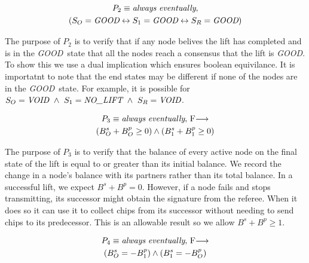 \documentclass[runningheads]{llncs}
\newcommand{\originatorstate}{S_O}
\newcommand{\relayastate}{S_1}
\newcommand{\refstate}{S_R}
\newcommand{\originatorsuccbal}{B^s_O}
\newcommand{\relayasuccbal}{B^s_1}
\newcommand{\originatorpredbal}{B^p_O}
\newcommand{\relayapredbal}{B^p_1}
\newcommand{\nolift}{\emph{NO\_LIFT}}
\newcommand{\void}{\emph{VOID}}
\newcommand{\good}{\emph{GOOD}}
\newcommand{\always}{\emph{always}}
\newcommand{\eventually}{\emph{eventually}}
\newcommand{\fair}{$F$}
\begin{document}
\begin{definition}[Property 2]
    
\begin{multline*}
P_2 \equiv \always\ \eventually, \\
    (\originatorstate = \good \leftrightarrow \relayastate = \good \leftrightarrow \refstate = \good) \\
\end{multline*}
\end{definition}
The purpose of $P_2$ is to verify that if any node belives the lift has completed and is in the \good\ state that all the nodes reach a consensus that the lift is \good. To show this we use a dual implication which ensures boolean equivilance. It is importatnt to note that the end states may be different if none of the nodes are in the \good\ state. For example, it is possible for $\originatorstate = \void\ \wedge\ \relayastate = \nolift\ \wedge\ \refstate = \void$.

\begin{definition}[Property 3]
\begin{multline*}
P_3 \equiv \always\ \eventually,\ \fair \longrightarrow \\
    (\originatorsuccbal + \originatorpredbal \ge 0) \wedge
    (\relayasuccbal + \relayapredbal \ge 0)\\
\end{multline*}
\end{definition}

The purpose of $P_3$ is to verify that the balance of every active node on the final state of the lift is equal to or greater than its initial balance. We record the change in a node's balance with its partners rather than its total balance. In a successful lift, we expect $B^s + B^p = 0$. However, if a node fails and stops transmitting, its successor might obtain the signature from the referee. When it does so it can use it to collect chips from its successor without needing to send chips to its predecessor. This is an allowable result so we allow $B^s + B^p \ge 1$.

\begin{definition}[Property 4]
\begin{multline*}
P_4 \equiv \always\ \eventually,\ \fair \longrightarrow \\
    (\originatorsuccbal = -\relayapredbal) \wedge
    (\relayasuccbal = -\originatorpredbal) \\
\end{multline*}
\end{definition}
\end{document}
